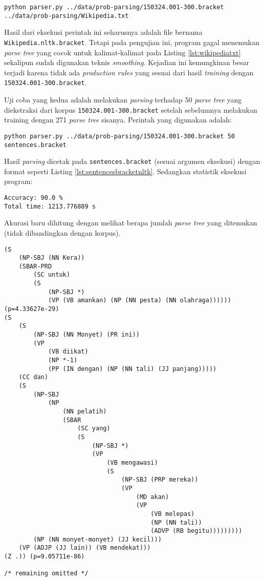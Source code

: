 \documentclass[paper=a4, fontsize=11pt]{scrartcl} %
\numberwithin{equation}{section} %
\numberwithin{figure}{section} %
\numberwithin{table}{section} %
\begin{document}
\begin{lstlisting}
python parser.py ../data/prob-parsing/150324.001-300.bracket ../data/prob-parsing/Wikipedia.txt
\end{lstlisting}

Hasil dari eksekusi perintah ini seharusnya adalah file bernama \verb|Wikipedia.nltk.bracket|. Tetapi pada pengujian ini, program gagal menemukan \textit{parse tree} yang cocok untuk kalimat-kalimat pada Listing \ref{lst:wikipediatxt} sekalipun sudah digunakan teknis \textit{smoothing}. Kejadian ini kemungkinan besar terjadi karena tidak ada \textit{production rules} yang sesuai dari hasil \textit{training} dengan \\\verb|150324.001-300.bracket|.

Uji coba yang kedua adalah melakukan \textit{parsing} terhadap 50 \textit{parse tree} yang diekstraksi dari korpus \verb|150324.001-300.bracket| setelah sebelumnya melakukan training dengan 271 \textit{parse tree} sisanya. Perintah yang digunakan adalah:

\begin{lstlisting}
python parser.py ../data/prob-parsing/150324.001-300.bracket 50 sentences.bracket
\end{lstlisting}

Hasil \textit{parsing} dicetak pada \verb|sentences.bracket| (sesuai argumen eksekusi) dengan format seperti Listing \ref{lst:sentencesbracketnltk}. Sedangkan statistik eksekusi program:

\begin{lstlisting}
Accuracy: 90.0 %
Total time: 1213.776889 s
\end{lstlisting}

Akurasi baru dihitung dengan melihat berapa jumlah \textit{parse tree} yang ditemukan (tidak dibandingkan dengan korpus).

\begin{lstlisting}[caption={sentences.bracket},label={lst:sentencesbracketnltk}]
(S
	(NP-SBJ (NN Kera))
	(SBAR-PRD
		(SC untuk)
		(S
			(NP-SBJ *)
			(VP (VB amankan) (NP (NN pesta) (NN olahraga)))))) (p=4.33627e-29)
(S
	(S
		(NP-SBJ (NN Monyet) (PR ini))
		(VP
			(VB diikat)
			(NP *-1)
			(PP (IN dengan) (NP (NN tali) (JJ panjang)))))
	(CC dan)
	(S
		(NP-SBJ
			(NP
				(NN pelatih)
				(SBAR
					(SC yang)
					(S
						(NP-SBJ *)
						(VP
							(VB mengawasi)
							(S
								(NP-SBJ (PRP mereka))
								(VP
									(MD akan)
									(VP
										(VB melepas)
										(NP (NN tali))
										(ADVP (RB begitu)))))))))
		(NP (NN monyet-monyet) (JJ kecil)))
	(VP (ADJP (JJ lain)) (VB mendekat)))
(Z .)) (p=9.05711e-86)
		
/* remaining omitted */
\end{lstlisting}
\end{document}
